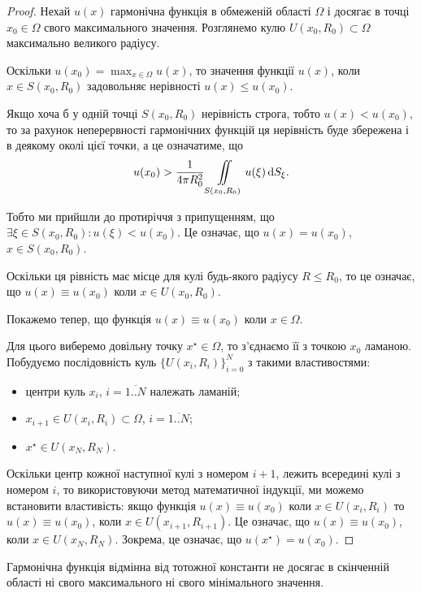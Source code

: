 \begin{proof}
	Нехай $u(x)$ гармонічна функція в обмеженій області $\Omega$ і досягає в точці $x_0 \in \Omega$ свого максимального значення. Розглянемо кулю $U(x_0, R_0) \subset \Omega$ максимально великого радіусу. \medskip

	Оскільки $u(x_0) = \max_{x \in \Omega} u(x)$, то значення функції $u(x)$, коли $x \in S(x_0, R_0)$ задовольняє нерівності $u(x) \le u(x_0)$. \medskip

	Якщо хоча б у одній точці $S(x_0, R_0)$ нерівність строга, тобто $u(x) < u(x_0)$, то за рахунок неперервності гармонічних функцій ця нерівність буде збережена і в деякому околі цієї точки, а це означатиме, що
	\begin{equation}
		u(x_0) > \frac{1}{4 \pi R_0^2} \displaystyle\iint\limits_{S(x_0,R_0)} u(\xi) \mathop{}\!\mathrm{d} S_\xi.
	\end{equation}

	Тобто ми прийшли до протиріччя з припущенням, що $\exists \xi \in S(x_0, R_0): u(\xi) < u(x_0)$. Це означає, що $u(x) = u(x_0)$, $x \in S(x_0, R_0)$. \medskip

	Оскільки ця рівність має місце для кулі будь-якого радіусу $R \le R_0$, то це означає, що $u(x) \equiv u(x_0)$  коли $x \in U(x_0, R_0)$. \medskip

	Покажемо тепер, що функція $u(x) \equiv u(x_0)$  коли $x \in \Omega$. \medskip

	Для цього виберемо довільну точку $x^\star \in \Omega$, то з'єднаємо її з точкою $x_0$ ламаною. Побудуємо послідовність куль $\{U(x_i, R_i)\}_{i=0}^N$ з такими властивостями: 
	\begin{itemize}
		\item центри куль $x_i$, $i = \overline{1..N}$ належать ламаній;
		\item $x_{i + 1} \in U(x_i, R_i) \subset \Omega$, $i = \overline{1..N}$;
		\item $x^\star \in U(x_N, R_N)$.
	\end{itemize}

	Оскільки центр кожної наступної кулі з номером $i + 1$, лежить всередині кулі з номером $i$, то використовуючи метод математичної індукції, ми можемо встановити властивість: якщо функція $u(x) \equiv u(x_0)$ коли $x \in U(x_i, R_i)$ то $u(x) \equiv u(x_0)$, коли $x \in U(x_{i+1}, R_{i+1})$. Це означає, що $u(x) \equiv u(x_0)$, коли $x \in U(x_N, R_N)$. Зокрема, це означає, що $u(x^\star) = u(x_0)$.
\end{proof}

\begin{corollary}
	Гармонічна функція відмінна від тотожної константи не досягає в скінченній області ні свого максимального ні свого мінімального значення.
\end{corollary}

